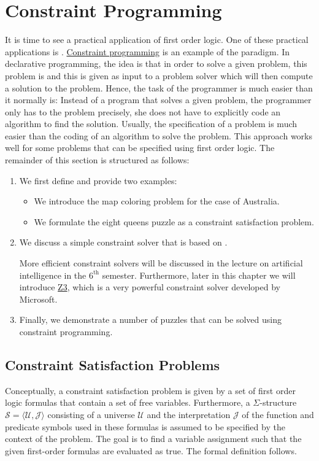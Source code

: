 \section{Constraint Programming}
It is time to see a practical application of first order logic.  One of these practical applications is .  
\href{https://en.wikipedia.org/wiki/Constraint_programming}{Constraint programming} is an example of the
  paradigm.  In declarative programming, the idea is that 
in order to solve a given problem, this problem is  and this  is
given as input to a problem solver which will then compute a solution to the problem.  Hence, the task of the
programmer is much easier than it normally is: Instead of  a program that solves a given problem,
the programmer only has to  the problem precisely, she does not have to explicitly code an algorithm to find the
solution.  Usually, the specification of a problem is much easier than the coding of an algorithm to solve the problem.  This approach works well for some problems
that can be specified using first order logic.  The remainder of this section is structured as follows:
\begin{enumerate}
\item We first define  and provide two examples:
      \begin{itemize}
      \item We introduce the map coloring problem for the case of Australia.
      \item We formulate the eight queens puzzle as a constraint satisfaction problem.  
      \end{itemize}
\item We discuss a simple constraint solver that is based on .

      More efficient constraint solvers will be discussed in the lecture on artificial intelligence in the
      $6^{\mathrm{th}}$ semester.  Furthermore, later in this chapter we will introduce
      \href{https://www.microsoft.com/en-us/research/project/z3-3/}{Z3}, which is a very powerful
      constraint solver developed by Microsoft.
\item Finally, we demonstrate a number of puzzles that can be solved using constraint programming.
\end{enumerate}

\subsection{Constraint Satisfaction Problems}
Conceptually, a constraint satisfaction problem is given by a set of first order logic formulas that contain a
set of free variables.  Furthermore, a $\Sigma$-structure $\mathcal{S} = \langle \mathcal{U},
\mathcal{J}\rangle $
consisting of a universe $\mathcal{U}$ and the interpretation $\mathcal{J}$ of the function and predicate 
symbols used in these formulas is assumed to be specified by the context of the problem.  The goal is 
to find a variable assignment such that the given first-order formulas are evaluated as true.  The formal
definition follows.


